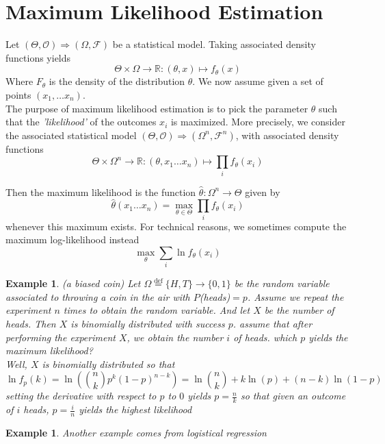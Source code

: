 \documentclass{book}
\theoremstyle{plain}
\newtheorem{example}[corollary]{Example}
\theoremstyle{definition}
\renewcommand{\d}[1]{\mathbb{#1}}
\newcommand{\define}{\stackrel{\operatorname{def}}{=}}
\newcommand{\fun}{\mapsto}
\newcommand{\mor}{\longrightarrow}
\renewcommand{\r}[1]{\mathcal{#1}}
\renewcommand{\r}[1]{\mathcal{#1}}
\begin{document}
\section{Maximum Likelihood Estimation}
Let $(\Theta, \r{O})\Longrightarrow (\Omega, \r{F})$ be a statistical model. Taking associated density functions yields
\[
\Theta\times \Omega \mor \d{R}:(\theta,x)\fun f_\theta(x)
\]
Where $F_\theta$ is the density of the distribution $\theta$. We now assume given a set of points $(x_1,\ldots x_n)$.\\ The purpose of maximum likelihood estimation is to pick the parameter $\theta$ such that the \emph{'likelihood'} of the outcomes $x_i$ is maximized. More precisely, we consider the associated statistical model $(\Theta,\r{O})\Longrightarrow (\Omega^n,\r{F}^n)$, with associated density functions
\[
\Theta\times \Omega^n\mor \d{R}:(\theta,x_1\ldots x_n)\fun \prod_i f_\theta(x_i)
\]


Then the maximum likelihood is the function $\hat{\theta}:\Omega^n\mor \Theta$ given by
\[
\hat{\theta}(x_1\ldots x_n)=\max_{\theta\in \Theta} \prod_i f_\theta(x_i)
\]
whenever this maximum exists. For technical reasons, we sometimes compute the maximum  log-likelihood instead
\[
\max_\theta \sum_i \ln f_\theta(x_i)
\]

\begin{example} (a biased coin)
Let $\Omega\define\{H,T\}\mor\{0,1\}$ be the random variable associated to throwing a coin in the air with $P$(heads)$=p$. Assume we repeat the experiment $n$ times to obtain the random variable. And let $X$ be the number of heads. Then $X$ is binomially distributed with success $p$. assume that after performing the experiment $X$, we obtain the number $i$ of heads. which $p$ yields the maximum likelihood?\\
Well, $X$ is binomially distributed so that
\[
\ln f_p(k)=\ln(\binom{n}{k}p^k(1-p)^{n-k})=\ln\binom{n}{k}+k\ln(p)+(n-k)\ln(1-p) 
\]
setting the derivative with respect to $p$ to $0$ yields $p=\frac{n}{k}$ so that given an outcome of $i$ heads, $p=\frac{i}{n}$ yields the highest likelihood
\end{example}

\begin{example}
Another example comes from logistical regression	
\end{example}
\end{document}
